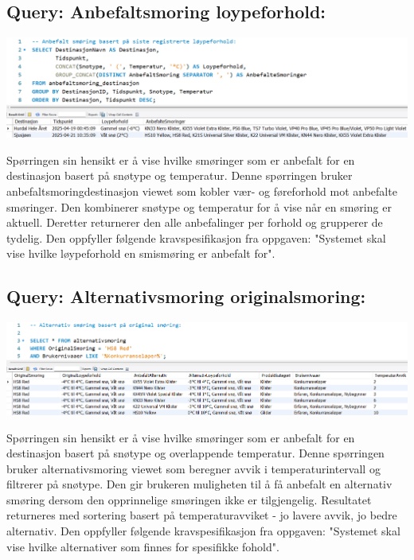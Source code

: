 \documentclass[10pt, a4paper]{article}
\begin{document}
\subsection{Query: Anbefaltsmoring loypeforhold:}

\includegraphics[width=\textwidth]{query_anbefaltsmoring_loypeforhold.png}

Spørringen sin hensikt er å vise hvilke smøringer som er anbefalt for en destinasjon basert på snøtype og temperatur. Denne spørringen bruker anbefaltsmoringdestinasjon viewet som kobler vær- og føreforhold mot anbefalte smøringer. Den kombinerer snøtype og temperatur for å vise når en smøring er aktuell. Deretter returnerer den alle anbefalinger per forhold og grupperer de tydelig. Den oppfyller følgende kravspesifikasjon fra oppgaven: "Systemet skal vise hvilke løypeforhold en smismøring er anbefalt for". 

\subsection{Query: Alternativsmoring originalsmoring:}

\includegraphics[width=\textwidth]{query_alternativsmoring.png}

Spørringen sin hensikt er å vise hvilke smøringer som er anbefalt for en destinasjon basert på snøtype og overlappende temperatur. Denne spørringen bruker alternativsmoring viewet som beregner avvik i temperaturintervall og filtrerer på snøtype. Den gir brukeren muligheten til å få anbefalt en alternativ smøring dersom den opprinnelige smøringen ikke er tilgjengelig. Resultatet returneres med sortering basert på temperaturavviket - jo lavere avvik, jo bedre alternativ. Den oppfyller følgende kravspesifikasjon fra oppgaven: "Systemet skal vise hvilke alternativer som finnes for spesifikke fohold".
\end{document}
